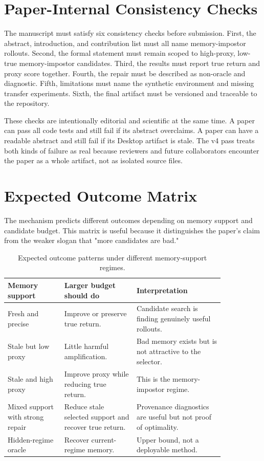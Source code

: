 \documentclass{article}
\begin{document}
\section{Paper-Internal Consistency Checks}
\label{app:internal-checks}

The manuscript must satisfy six consistency checks before submission. First,
the abstract, introduction, and contribution list must all name memory-impostor
rollouts. Second, the formal statement must remain scoped to high-proxy,
low-true memory-impostor candidates. Third, the results must report true
return and proxy score together. Fourth, the repair must be described as
non-oracle and diagnostic. Fifth, limitations must name the synthetic
environment and missing transfer experiments. Sixth, the final artifact must
be versioned and traceable to the repository.

These checks are intentionally editorial and scientific at the same time. A
paper can pass all code tests and still fail if its abstract overclaims. A
paper can have a readable abstract and still fail if its Desktop artifact is
stale. The v4 pass treats both kinds of failure as real because reviewers and
future collaborators encounter the paper as a whole artifact, not as isolated
source files.

\section{Expected Outcome Matrix}
\label{app:outcome-matrix}

The mechanism predicts different outcomes depending on memory support and
candidate budget. This matrix is useful because it distinguishes the paper's
claim from the weaker slogan that "more candidates are bad."

\begin{table}[t]
\centering
\small
\caption{Expected outcome patterns under different memory-support regimes.}
\label{tab:outcome-matrix}
\begin{tabular}{p{0.22\linewidth}p{0.28\linewidth}p{0.34\linewidth}}
\toprule
Memory support & Larger budget should do & Interpretation \\
\midrule
Fresh and precise & Improve or preserve true return. & Candidate search is
finding genuinely useful rollouts. \\
Stale but low proxy & Little harmful amplification. & Bad memory exists but is
not attractive to the selector. \\
Stale and high proxy & Improve proxy while reducing true return. & This is the
memory-impostor regime. \\
Mixed support with strong repair & Reduce stale selected support and recover
true return. & Provenance diagnostics are useful but not proof of optimality. \\
Hidden-regime oracle & Recover current-regime memory. & Upper bound, not a
deployable method. \\
\bottomrule
\end{tabular}
\end{table}
\end{document}
